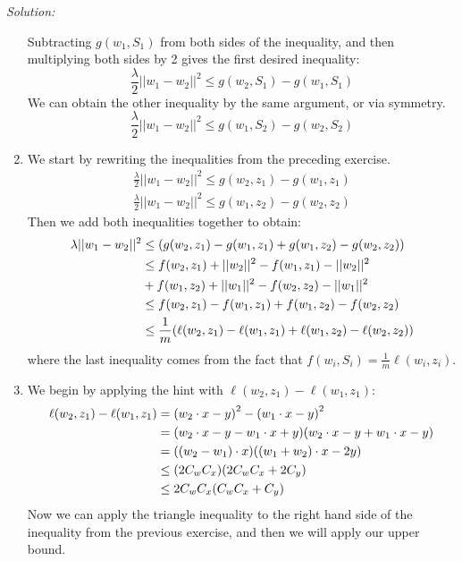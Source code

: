 \documentclass[
10pt, %
a4paper, %
oneside, %
headinclude,footinclude, %
BCOR5mm, %
]{scrartcl}
\newenvironment{solution}
               {\textit{Solution:}}
               {}
\begin{document}
\begin{solution}
\begin{enumerate}
      Subtracting $g(w_1, S_1)$ from both sides of the inequality, and then multiplying both sides by 2 gives the first desired inequality:
      \[\frac{\lambda}{2}||w_1-w_2||^2 \leq g(w_2,S_1)-g(w_1, S_1)\]
      We can obtain the other inequality by the same argument, or via symmetry.
      \[\frac{\lambda}{2}||w_1-w_2||^2 \leq g(w_1,S_2)-g(w_2, S_2)\]
    \item We start by rewriting the inequalities from the preceding exercise.
      \begin{align*}
        \frac{\lambda}{2}||w_1-w_2||^2 \leq g(w_2, z_1)-g(w_1, z_1) \\
        \frac{\lambda}{2}||w_1-w_2||^2 \leq g(w_1, z_2)-g(w_2, z_2)
      \end{align*}
      Then we add both inequalities together to obtain:
      \begin{align*}
        \lambda ||w_1-w_2||^2 &\leq (g(w_2,z_1)-g(w_1,z_1)+g(w_1,z_2)-g(w_2,z_2)) \\
        \hphantom{\lambda ||w_1-w_2||^2} &\leq f(w_2,z_1) + ||w_2||^2 -f(w_1,z_1) - ||w_2||^2 \\
        \hphantom{\lambda ||w_1-w_2||^2}&+f(w_1,z_2) + ||w_1||^2-f(w_2,z_2) - ||w_1||^2 \\
        &\leq f(w_2,z_1)-f(w_1,z_1)+f(w_1,z_2)-f(w_2,z_2) \\
        &\leq \frac{1}{m} (\ell(w_2,z_1)-\ell(w_1,z_1)+\ell(w_1,z_2)-\ell(w_2,z_2))
      \end{align*}
      where the last inequality comes from the fact that $f(w_i,S_i) = \frac{1}{m}\ell(w_i, z_i)$.
    \item We begin by applying the hint with $\ell(w_2,z_1) - \ell(w_1,z_1)$:
        \begin{align*}
          \ell(w_2,z_1) - \ell(w_1,z_1) &= {(w_2\cdot x - y)}^2 - {(w_1\cdot x - y)}^2 \\
          \hphantom{\ell(w_2,z_1) - \ell(w_1,z_1)} &= (w_2\cdot x - y - w_1\cdot x + y)(w_2\cdot x - y + w_1\cdot x - y) \\
          \hphantom{\ell(w_2,z_1) - \ell(w_1,z_1)} &= ((w_2 - w_1)\cdot x)((w_1 + w_2)\cdot x - 2y) \\
          \hphantom{\ell(w_2,z_1) - \ell(w_1,z_1)} &\leq (2C_w C_x)(2C_w C_x+2C_y) \\
          \hphantom{\ell(w_2,z_1) - \ell(w_1,z_1)} &\leq 2C_w C_x(C_w C_x + C_y)
        \end{align*}
        Now we can apply the triangle inequality to the right hand side of the inequality from the previous exercise, and then we will apply our upper bound.

\end{enumerate}
\end{solution}
\end{document}

